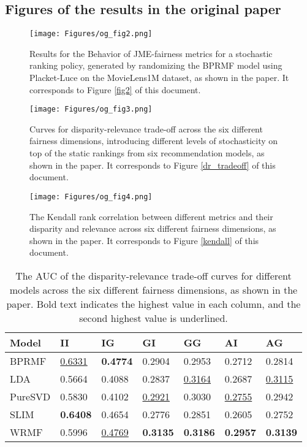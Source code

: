 \subsection{Figures of the results in the original paper} \label{og_results}
\begin{figure}[H]
    \centering
    \texttt{[image: Figures/og\_fig2.png]}
    \caption{Results for the Behavior of JME-fairness metrics for a stochastic ranking policy, generated by randomizing the BPRMF model using Placket-Luce on the MovieLens1M dataset, as shown in the paper. It corresponds to Figure \ref{fig2} of this document.}
    \label{fig: og_fig2}
\end{figure}
\begin{figure}[H]
    \centering
    \texttt{[image: Figures/og\_fig3.png]}
    \caption{Curves for disparity-relevance trade-off across the six different fairness dimensions, introducing different levels of stochasticity on top of the static rankings from six recommendation models, as shown in the paper. It corresponds to Figure \ref{dr_tradeoff} of this document.}
    \label{fig: og_fig3}
\end{figure}
\begin{figure}[H]
    \centering
    \texttt{[image: Figures/og\_fig4.png]}
    \caption{The Kendall rank correlation between different metrics and their disparity and relevance across six different fairness dimensions, as shown in the paper. It corresponds to Figure \ref{kendall} of this document.}
    \label{fig: og_fig4}
\end{figure}
\begin{table}[H]
{\centering
\begin{tabular}{lllllll}
\hline
\textbf{Model} & \textbf{II} & \textbf{IG} & \textbf{GI} & \textbf{GG} & \textbf{AI} & \textbf{AG} \\
\hline
BPRMF  &  \underline{0.6331}  &  \textbf{0.4774}  &  0.2904  &  0.2953  &  0.2712  &  0.2814  \\ 
LDA  &  0.5664  &  0.4088  &  0.2837  &  \underline{0.3164}  &  0.2687  &  \underline{0.3115}  \\ 
PureSVD  &  0.5830  &  0.4102  &  \underline{0.2921}  &  0.3030  &  \underline{0.2755}  &  0.2942  \\ 
SLIM  &  \textbf{0.6408}  &  0.4654  &  0.2776  &  0.2851  &  0.2605 &  0.2752  \\ 
WRMF  &  0.5996  &  \underline{0.4769}  &  \textbf{0.3135}  &  \textbf{0.3186}  &  \textbf{0.2957}  &  \textbf{0.3139}  \\ 
\hline
\end{tabular}\par }
\caption{\label{original_auc}
The AUC of the disparity-relevance trade-off curves for different models across the six different fairness dimensions, as shown in the paper. Bold text indicates the highest value in each column, and the second highest value is underlined. 
}
\end{table}

